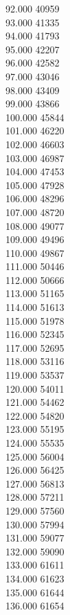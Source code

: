 { 92.000	40959 \\
 93.000	41335 \\
 94.000	41793 \\
 95.000	42207 \\
 96.000	42582 \\
 97.000	43046 \\
 98.000	43409 \\
 99.000	43866 \\
 100.000	45844 \\
 101.000	46220 \\
 102.000	46603 \\
 103.000	46987 \\
 104.000	47453 \\
 105.000	47928 \\
 106.000	48296 \\
 107.000	48720 \\
 108.000	49077 \\
 109.000	49496 \\
 110.000	49867 \\
 111.000	50446 \\
 112.000	50666 \\
 113.000	51165 \\
 114.000	51613 \\
 115.000	51978 \\
 116.000	52345 \\
 117.000	52695 \\
 118.000	53116 \\
 119.000	53537 \\
 120.000	54011 \\
 121.000	54462 \\
 122.000	54820 \\
 123.000	55195 \\
 124.000	55535 \\
 125.000	56004 \\
 126.000	56425 \\
 127.000	56813 \\
 128.000	57211 \\
 129.000	57560 \\
 130.000	57994 \\
 131.000	59077 \\
 132.000	59090 \\
 133.000	61611 \\
 134.000	61623 \\
 135.000	61644 \\
 136.000	61654 \\
}
